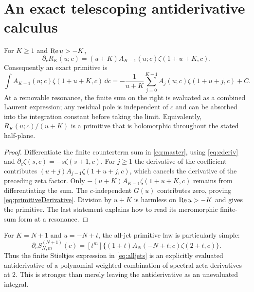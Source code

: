 \section{An exact telescoping antiderivative calculus}\label{sec:primitives}

\begin{theorem}\label{thm:primitive}
For $K\ge1$ and $\operatorname{Re} u>-K$,
\begin{equation}\label{eq:primitiveDerivative}
 \boxed{\partial_c R_K(u;c)
 =(u+K)A_{K-1}(u;c)\zeta(1+u+K,c).}
\end{equation}
Consequently an exact primitive is
\begin{equation}\label{eq:primitive}
 \int A_{K-1}(u;c)\zeta(1+u+K,c)\,\dd c
 =-\frac1{u+K}\sum_{j=0}^{K-1}
 A_j(u;c)\zeta(1+u+j,c)+C.
\end{equation}
At a removable resonance, the finite sum on the right is evaluated as a
combined Laurent expression; any residual pole is independent of $c$ and
can be absorbed into the integration constant before taking the limit.
Equivalently, $R_K(u;c)/(u+K)$ is a primitive that is holomorphic throughout
the stated half-plane.
\end{theorem}
\begin{proof}
Differentiate the finite counterterm sum in \eqref{eq:master}, using
\eqref{eq:cderiv} and
$\partial_c\zeta(s,c)=-s\zeta(s+1,c)$.
For $j\ge1$ the derivative of the coefficient contributes
$(u+j)A_{j-1}\zeta(1+u+j,c)$, which cancels the derivative of the preceding
zeta factor.  Only
$-(u+K)A_{K-1}\zeta(1+u+K,c)$ remains from differentiating the sum.
The $c$-independent $G(u)$ contributes zero, proving
\eqref{eq:primitiveDerivative}.  Division by $u+K$ is harmless on
$\operatorname{Re} u>-K$ and gives the primitive.  The last statement explains how to
read its meromorphic finite-sum form at a resonance.
\end{proof}

For $K=N+1$ and $u=-N+t$, the all-jet primitive law is particularly simple:
\begin{equation}\label{eq:primitivejets}
 \partial_c S_{N,m}^{(N+1)}(c)
 =[t^m]\{(1+t)A_N(-N+t;c)\zeta(2+t,c)\}.
\end{equation}
Thus the finite Stieltjes expression in \eqref{eq:alljets} is an explicitly
evaluated antiderivative of a polynomial-weighted combination of spectral
zeta derivatives at $2$.  This is stronger than merely leaving the
antiderivative as an unevaluated integral.

